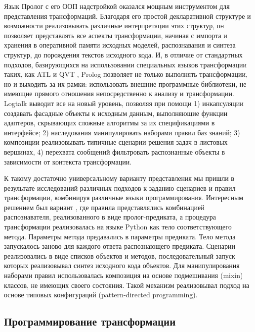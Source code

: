 \documentclass[12pt]{article}
\begin{document}
Язык Пролог с его ООП надстройкой оказался мощным инструментом для представления трансформаций.  Благодаря его простой декларативной структуре и возможности реализовывать различные интерпретации этих структур, он позволяет представлять все аспекты трансформации, начиная с импорта и хранения в оперативной памяти исходных моделей, распознавания и синтеза структур, до порождения текстов исходного кода.  И, в отличие от стандартных подходов, базирующихся на использовании специальных языков трансформации таких, как ATL и QVT \cite{QVT}, Prolog позволяет не только выполнять трансформации, но и выходить за их рамки: использовать внешние программные библиотеки, не имеющие прямого отношения непосредственно к анализу и трансформации.  Logtalk выводит все на новый уровень, позволяя при помощи 1) инкапсуляции создавать фасадные объекты к исходным данным, выполняющие функции адаптеров, скрывающих сложные алгоритмы за их спецификациями в интерфейсе; 2) наследования манипулировать наборами правил баз знаний; 3) композиции реализовывать типичные сценарии решения задач в листовых вершинах, 4) перехвата сообщений фильтровать распознанные объекты в зависимости от контекста трансформации.

К такому достаточно универсальному варианту представления мы пришли в результате исследований различных подходов к заданию сценариев и правил трансформации, комбинируя различные языки программирования.  Интересным решением был вариант \cite{b2}, где правила представлялись комбинацией распознавателя, реализованного в виде пролог-предиката, а процедура трансформации реализовалась на языке Python как тело соответствующего метода.  Параметры метода предавались в параметры предиката.  Тело метода запускалось заново для каждого ответа распознающего предиката.  Сценарии реализовались в виде списков объектов и методов, последовательный запуск которых реализовывал синтез исходного кода объектов.  Для манипулирования наборами правил использовалась композиция на основе подмешивания (mixin) классов, не имеющих своего состояния.  Такой механизм реализовывал подход на основе типовых конфигураций (pattern-directed programming).

\subsection{Программирование трансформации}
\end{document}
